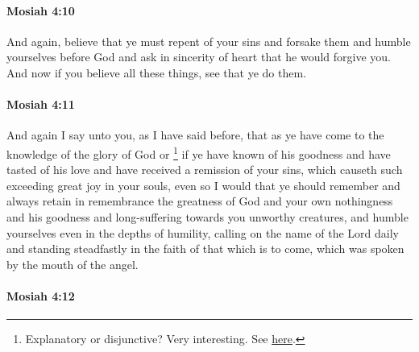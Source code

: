 		\paragraph{Mosiah 4:10} %
			\label{MOSIAH-4-10}

			And again, believe that ye must repent of your sins and forsake them
			and humble yourselves before God and ask in sincerity of heart
			that he would forgive you.
			And now if you believe all these things,
			see that ye do them.

		\paragraph{Mosiah 4:11} %
			\label{MOSIAH-4-11}

			And again I say unto you, as I have said before,
			that as ye have come to the knowledge of the glory of God
			or%
				\footnote{%
					\label{MOSIAH-4-11-NOTE-or}%
					Explanatory or disjunctive? Very interesting. See \hyperref[OR-COMMENTARY-explanatory]{here}.
					}
			if ye have known of his goodness and have tasted of his love
			and have received a remission of your sins,
			which causeth such exceeding great joy in your souls,
			even so I would that ye should remember and always retain in remembrance
			the greatness of God and your own nothingness
			and his goodness and long-suffering towards you unworthy creatures,
			and humble yourselves even in the depths of humility,
			calling on the name of the Lord daily
			and standing steadfastly in the faith of that which is to come,
			which was spoken by the mouth of the angel.

		\paragraph{Mosiah 4:12} %
			\label{MOSIAH-4-12}

